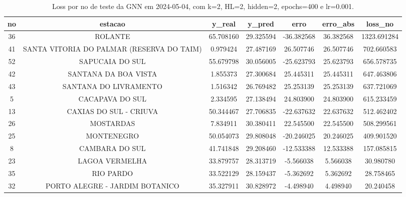 \begin{table}[h]
\centering
\caption{Loss por no de teste da GNN em 2024-05-04, com k=2, HL=2, hidden=2, epochs=400 e lr=0.001.}
\label{tab:gnn_loss_k2_hl2_h2_e400_d20240504}
\begin{tabular}{ccccccc}
\toprule
no & estacao & y\_real & y\_pred & erro & erro\_abs & loss\_no \\
\midrule
36 & ROLANTE & 65.708160 & 29.325594 & -36.382568 & 36.382568 & 1323.691284 \\
41 & SANTA VITORIA DO PALMAR (RESERVA DO TAIM) & 0.979424 & 27.487169 & 26.507746 & 26.507746 & 702.660583 \\
52 & SAPUCAIA DO SUL & 55.679798 & 30.056005 & -25.623793 & 25.623793 & 656.578735 \\
42 & SANTANA DA BOA VISTA & 1.855373 & 27.300684 & 25.445311 & 25.445311 & 647.463806 \\
43 & SANTANA DO LIVRAMENTO & 1.516342 & 26.769482 & 25.253139 & 25.253139 & 637.721069 \\
5 & CACAPAVA DO SUL & 2.334595 & 27.138494 & 24.803900 & 24.803900 & 615.233459 \\
13 & CAXIAS DO SUL - CRIUVA & 50.344467 & 27.706835 & -22.637632 & 22.637632 & 512.462402 \\
26 & MOSTARDAS & 7.834911 & 30.380411 & 22.545500 & 22.545500 & 508.299561 \\
25 & MONTENEGRO & 50.054073 & 29.808048 & -20.246025 & 20.246025 & 409.901520 \\
8 & CAMBARA DO SUL & 41.741848 & 29.208460 & -12.533388 & 12.533388 & 157.085815 \\
23 & LAGOA VERMELHA & 33.879757 & 28.313719 & -5.566038 & 5.566038 & 30.980780 \\
35 & RIO PARDO & 33.522129 & 28.159437 & -5.362692 & 5.362692 & 28.758465 \\
32 & PORTO ALEGRE - JARDIM BOTANICO & 35.327911 & 30.828972 & -4.498940 & 4.498940 & 20.240458 \\
\bottomrule
\end{tabular}
\end{table}
